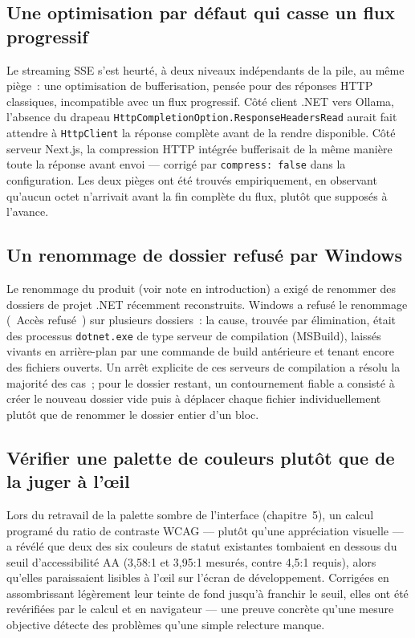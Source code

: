 \documentclass[12pt,a4paper]{article}
\newcommand{\code}[1]{\texttt{\small #1}}
\begin{document}
\subsection{Une optimisation par d\'efaut qui casse un flux progressif}

Le streaming SSE s'est heurt\'e, \`a deux niveaux ind\'ependants de la pile, au m\^eme pi\`ege~: une optimisation de bufferisation, pens\'ee pour des r\'eponses HTTP classiques, incompatible avec un flux progressif. C\^ot\'e client .NET vers Ollama, l'absence du drapeau \code{HttpCompletionOption.ResponseHeadersRead} aurait fait attendre \`a \code{HttpClient} la r\'eponse compl\`ete avant de la rendre disponible. C\^ot\'e serveur Next.js, la compression HTTP int\'egr\'ee bufferisait de la m\^eme mani\`ere toute la r\'eponse avant envoi --- corrig\'e par \code{compress: false} dans la configuration. Les deux pi\`eges ont \'et\'e trouv\'es empiriquement, en observant qu'aucun octet n'arrivait avant la fin compl\`ete du flux, plut\^ot que suppos\'es \`a l'avance.

\subsection{Un renommage de dossier refus\'e par Windows}

Le renommage du produit (voir note en introduction) a exig\'e de renommer des dossiers de projet .NET r\'ecemment reconstruits. Windows a refus\'e le renommage (\guillemotleft~Acc\`es refus\'e~\guillemotright) sur plusieurs dossiers~: la cause, trouv\'ee par \'elimination, \'etait des processus \code{dotnet.exe} de type serveur de compilation (MSBuild), laiss\'es vivants en arri\`ere-plan par une commande de build ant\'erieure et tenant encore des fichiers ouverts. Un arr\^et explicite de ces serveurs de compilation a r\'esolu la majorit\'e des cas~; pour le dossier restant, un contournement fiable a consist\'e \`a cr\'eer le nouveau dossier vide puis \`a d\'eplacer chaque fichier individuellement plut\^ot que de renommer le dossier entier d'un bloc.

\subsection{V\'erifier une palette de couleurs plut\^ot que de la juger \`a l'\oe{}il}

Lors du retravail de la palette sombre de l'interface (chapitre~5), un calcul program\'e du ratio de contraste WCAG --- plut\^ot qu'une appr\'eciation visuelle --- a r\'ev\'el\'e que deux des six couleurs de statut existantes tombaient en dessous du seuil d'accessibilit\'e AA (3,58:1 et 3,95:1 mesur\'es, contre 4,5:1 requis), alors qu'elles paraissaient lisibles \`a l'\oe{}il sur l'\'ecran de d\'eveloppement. Corrig\'ees en assombrissant l\'eg\`erement leur teinte de fond jusqu'\`a franchir le seuil, elles ont \'et\'e revérifi\'ees par le calcul et en navigateur --- une preuve concr\`ete qu'une mesure objective d\'etecte des probl\`emes qu'une simple relecture manque.
\end{document}
